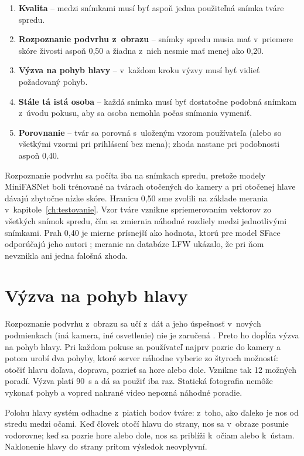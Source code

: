 \documentclass[12pt,a4paper,oneside]{report}
\begin{document}
\begin{enumerate}
  \item \textbf{Kvalita} -- medzi snímkami musí byť aspoň jedna použiteľná snímka tváre
        spredu.
  \item \textbf{Rozpoznanie podvrhu z~obrazu} -- snímky spredu musia mať v~priemere
        skóre živosti aspoň 0,50 a žiadna z~nich nesmie mať menej ako 0,20.
  \item \textbf{Výzva na pohyb hlavy} -- v~každom kroku výzvy musí byť vidieť
        požadovaný pohyb.
  \item \textbf{Stále tá istá osoba} -- každá snímka musí byť dostatočne podobná
        snímkam z~úvodu pokusu, aby sa osoba nemohla počas snímania vymeniť.
  \item \textbf{Porovnanie} -- tvár sa porovná s~uloženým vzorom používateľa (alebo so
        všetkými vzormi pri prihlásení bez mena); zhoda nastane pri podobnosti aspoň 0,40.
\end{enumerate}

Rozpoznanie podvrhu sa počíta iba na snímkach spredu, pretože modely MiniFASNet boli
trénované na tvárach otočených do kamery a pri otočenej hlave dávajú zbytočne nízke
skóre. Hranicu 0,50 sme zvolili na základe merania v~kapitole~\ref{ch:testovanie}.
Vzor tváre vznikne spriemerovaním vektorov zo všetkých snímok spredu, čím sa zmiernia
náhodné rozdiely medzi jednotlivými snímkami. Prah 0,40 je mierne prísnejší ako hodnota,
ktorú pre model SFace odporúčajú jeho autori \cite{opencvzoo}; meranie na databáze LFW
ukázalo, že pri ňom nevznikla ani jedna falošná zhoda.

\section{Výzva na pohyb hlavy}

Rozpoznanie podvrhu z~obrazu sa učí z~dát a jeho úspešnosť v~nových podmienkach (iná
kamera, iné osvetlenie) nie je zaručená \cite{sun2023rethinking}. Preto ho dopĺňa výzva
na pohyb hlavy. Pri každom pokuse sa používateľ najprv pozrie do kamery a potom urobí
dva pohyby, ktoré server náhodne vyberie zo štyroch možností: otočiť hlavu doľava,
doprava, pozrieť sa hore alebo dole. Vznikne tak 12 možných poradí. Výzva platí 90~s
a dá sa použiť iba raz. Statická fotografia nemôže vykonať pohyb a vopred nahrané video
nepozná náhodné poradie.

Polohu hlavy systém odhadne z~piatich bodov tváre: z~toho, ako ďaleko je nos od stredu
medzi očami. Keď človek otočí hlavu do strany, nos sa v~obraze posunie vodorovne; keď
sa pozrie hore alebo dole, nos sa priblíži k~očiam alebo k~ústam. Naklonenie hlavy do
strany pritom výsledok neovplyvní.
\end{document}
